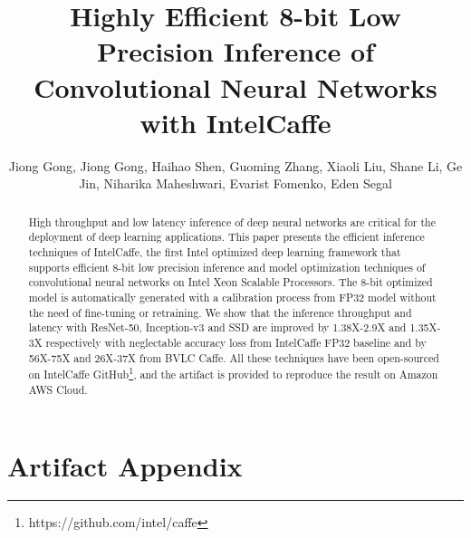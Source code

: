 \documentclass[sigplan]{acmart}
\begin{document}
\title{Highly Efficient 8-bit Low Precision Inference of Convolutional Neural Networks with IntelCaffe \\}

\author{Jiong Gong, Jiong Gong, Haihao Shen, Guoming Zhang, Xiaoli Liu, Shane Li, Ge Jin, Niharika Maheshwari, Evarist Fomenko, Eden Segal}

\renewcommand{\shortauthors}{}
\renewcommand{\shorttitle}{}

\begin{abstract}
High throughput and low latency inference of deep neural networks are critical for the deployment of deep learning applications. This paper presents the efficient inference techniques of IntelCaffe, the first Intel\textsuperscript{\textregistered} optimized deep learning framework that supports efficient 8-bit low precision inference and model optimization techniques of convolutional neural networks on Intel\textsuperscript{\textregistered} Xeon\textsuperscript{\textregistered} Scalable Processors. The 8-bit optimized model is automatically generated with a calibration process from FP32 model without the need of fine-tuning or retraining. We show that the inference throughput and latency with ResNet-50, Inception-v3 and SSD are improved by 1.38X-2.9X and 1.35X-3X respectively with neglectable accuracy loss from IntelCaffe FP32 baseline and by 56X-75X and 26X-37X from BVLC Caffe. All these techniques have been open-sourced on IntelCaffe GitHub\footnote{https://github.com/intel/caffe}, and the artifact is provided to reproduce the result on Amazon AWS Cloud.
\end{abstract}


\maketitle






\newpage

\onecolumn

\appendix
\section{Artifact Appendix}
\end{document}
